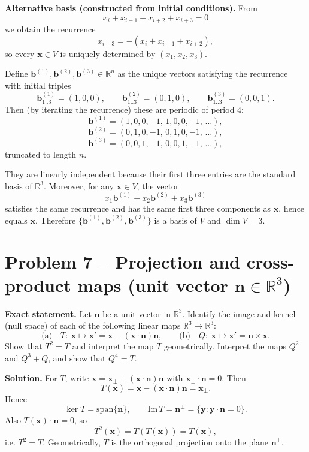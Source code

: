 \documentclass[12pt,a4paper]{article}
\theoremstyle{plain}
\theoremstyle{definition}      %
\begin{document}
\textbf{Alternative basis (constructed from initial conditions).}
From
\[
x_i+x_{i+1}+x_{i+2}+x_{i+3}=0
\]
we obtain the recurrence
\[
x_{i+3}=-(x_i+x_{i+1}+x_{i+2}),
\]
so every $\mathbf x\in V$ is uniquely determined by $(x_1,x_2,x_3)$.

Define $\mathbf b^{(1)},\mathbf b^{(2)},\mathbf b^{(3)}\in\mathbb R^n$ as the unique vectors satisfying the recurrence with initial triples
\[
\mathbf b^{(1)}_{1..3}=(1,0,0),\qquad
\mathbf b^{(2)}_{1..3}=(0,1,0),\qquad
\mathbf b^{(3)}_{1..3}=(0,0,1).
\]
Then (by iterating the recurrence) these are periodic of period $4$:
\[
\mathbf b^{(1)}=(1,0,0,-1,\,1,0,0,-1,\,\dots),
\]
\[
\mathbf b^{(2)}=(0,1,0,-1,\,0,1,0,-1,\,\dots),
\]
\[
\mathbf b^{(3)}=(0,0,1,-1,\,0,0,1,-1,\,\dots),
\]
truncated to length $n$.

They are linearly independent because their first three entries are the standard basis of $\mathbb R^3$.
Moreover, for any $\mathbf x\in V$, the vector
\[
x_1\mathbf b^{(1)}+x_2\mathbf b^{(2)}+x_3\mathbf b^{(3)}
\]
satisfies the same recurrence and has the same first three components as $\mathbf x$, hence equals $\mathbf x$.
Therefore $\{\mathbf b^{(1)},\mathbf b^{(2)},\mathbf b^{(3)}\}$ is a basis of $V$ and $\dim V=3$.

\section*{Problem 7 -- Projection and cross-product maps (unit vector $\mathbf n\in\mathbb R^3$)}

\textbf{Exact statement.}
Let $\mathbf n$ be a unit vector in $\mathbb R^3$. Identify the image and kernel (null space) of each of the following linear maps $\mathbb R^3\to\mathbb R^3$:
\[
\text{(a)}\quad T:\ \mathbf x\mapsto \mathbf x'=\mathbf x-(\mathbf x\cdot\mathbf n)\mathbf n,
\qquad
\text{(b)}\quad Q:\ \mathbf x\mapsto \mathbf x'=\mathbf n\times \mathbf x.
\]
Show that $T^2=T$ and interpret the map $T$ geometrically. Interpret the maps $Q^2$ and $Q^3+Q$, and show that $Q^4=T$.

\textbf{Solution.}
For $T$, write $\mathbf x=\mathbf x_\perp+(\mathbf x\cdot\mathbf n)\mathbf n$ with $\mathbf x_\perp\cdot\mathbf n=0$. Then
\[
T(\mathbf x)=\mathbf x-(\mathbf x\cdot\mathbf n)\mathbf n=\mathbf x_\perp.
\]
Hence
\[
\ker T=\mathrm{span}\{\mathbf n\},\qquad \mathrm{Im}\,T=\mathbf n^\perp=\{\mathbf y:\mathbf y\cdot\mathbf n=0\}.
\]
Also $T(\mathbf x)\cdot\mathbf n=0$, so
\[
T^2(\mathbf x)=T(T(\mathbf x))=T(\mathbf x),
\]
i.e. $T^2=T$. Geometrically, $T$ is the orthogonal projection onto the plane $\mathbf n^\perp$.
\end{document}
